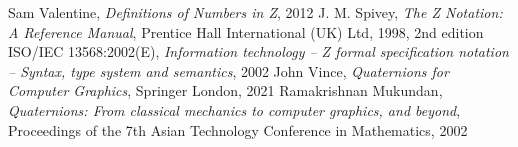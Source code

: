 \documentclass[12pt]{article}
\begin{document}
% 
\begin{thebibliography}{99}
	Sam Valentine,
  	\textit{Definitions of Numbers in Z},
    2012
    J. M. Spivey,
    \textit{The Z Notation: A Reference Manual},
    Prentice Hall International (UK) Ltd,
    1998,
    2nd edition
    ISO/IEC 13568:2002(E),
    \textit{Information technology -- Z formal specification notation -- Syntax, type system and semantics},
    2002
    John Vince,
    \textit{Quaternions for Computer Graphics},
    Springer London,
    2021
      Ramakrishnan Mukundan,
      \textit{Quaternions: From classical mechanics to computer graphics, and beyond},
      Proceedings of the 7th Asian Technology Conference in Mathematics,
      2002
\end{thebibliography}
\end{document}
